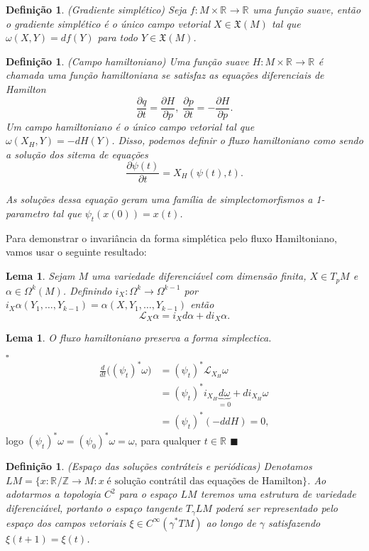 \documentclass[12pt]{book}
\newtheorem{lema}[teorema]{Lema}
\newtheorem{definicao}[teorema]{Definição}
\newenvironment{prova}[1]{$\square$ #1}{\hfill$\blacksquare$}
\newcommand{\bigparenteses}[1]{\big( #1 \big) }
\newcommand{\dparcial}[2]{\frac{\partial #1}{\partial #2}}
\newcommand{\liederivada}[1]{\mathcal{L}_{#1}}
\newcommand{\real}[1]{\mathbb{R}^{#1}}
\begin{document}
	\begin{definicao}
		(Gradiente simplético) Seja $f : M \times \real{} \to \real{}$ uma função suave, então o gradiente simplético é o único campo vetorial $X \in \mathfrak{X}(M)$ tal que $\omega(X, Y) = df(Y)$ para todo $Y \in \mathfrak{X}(M)$.
	\end{definicao}
	
	\begin{definicao}
		(Campo hamiltoniano) Uma função suave $H : M \times \real{} \to \real{}$ é chamada uma função hamiltoniana se satisfaz as equações diferenciais de Hamilton
		$$
		\frac{\partial q}{\partial t} = \frac{\partial H}{\partial p}, \; \frac{\partial p}{\partial t} = -\frac{\partial H}{\partial p}. 
		$$
		Um campo hamiltoniano é o único campo vetorial tal que $\omega(X_{H}, Y) = -dH(Y)$. Disso, podemos definir o fluxo hamiltoniano como sendo a solução dos sitema de equações 
		$$
		\label{sisHamilt}
		\dparcial{\psi(t)}{t} = X_{H}(\psi(t), t).
		$$
		
		As soluções dessa equação geram uma família de simplectomorfismos a 1-parametro tal que $\psi_{t}(x(0)) = x(t)$.
	\end{definicao}
	Para demonstrar o invariância da forma simplética pelo fluxo Hamiltoniano, vamos usar o seguinte resultado:
	\begin{lema}
		Sejam $M$ uma variedade diferenciável com dimensão finita, $X \in T_{p}M$ e $\alpha \in \Omega^{k}(M)$. Definindo $i_{X}:\Omega^{k} \to \Omega^{k-1}$ por $i_{X}\alpha(Y_{1}, \dots, Y_{k-1}) = \alpha(X, Y_{1}, \dots, Y_{k-1})$ então
		$$
		\liederivada{X}\alpha = i_{X}d\alpha + di_{X}\alpha.
		$$
	\end{lema}
	\begin{lema}
		O fluxo hamiltoniano preserva a forma simplectica.
	\end{lema}
	\begin{prova}\label{fluxo_convervativo}
			$$
			\begin{aligned}
			\frac{d}{dt}\bigparenteses{(\psi_{t})^{*}\omega} 
			&= (\psi_{t})^{*} \liederivada{X_{H}}\omega  
			\\
			&= (\psi_{t})^{*} i_{X_{H}}\underbrace{d\omega }_ {=0}+ di_{X_{H}}\omega 
			\\
			&= (\psi_{t})^{*} (-ddH)=0,
			\end{aligned}
			$$
			logo $(\psi_{t})^{*} \omega = (\psi_{0})^{*} \omega = \omega$, para qualquer $t \in \real{}$
	\end{prova}
	
	\begin{definicao}
		(Espaço das soluções contráteis e periódicas) Denotamos $LM = \{x:\real{}/\mathbb{Z} \to M: x \; \text{é solução contrátil das equações de Hamilton} \}$. Ao adotarmos a topologia $C^{2}$ para o espaço $LM$ teremos uma estrutura de variedade diferenciável, portanto o espaço tangente $T_{\gamma}LM$ poderá ser representado pelo espaço dos campos vetoriais $\xi \in  C^{\infty}(\gamma^{*}TM)$ ao longo de $\gamma$ satisfazendo $\xi(t+1) = \xi(t)$.
	\end{definicao}	
	
\end{document}
